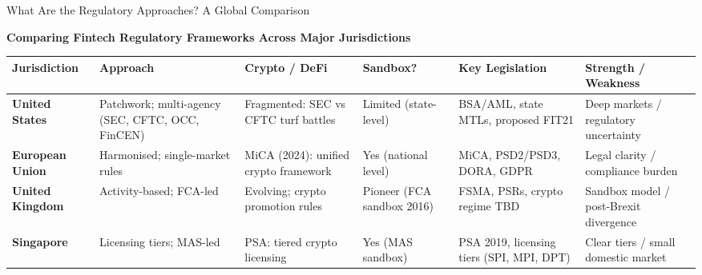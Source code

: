 \documentclass[aspectratio=169, 11pt]{beamer}
\begin{document}
\begin{frame}[shrink=5]{What Are the Regulatory Approaches? A Global Comparison}

\vspace{-0.1em}
\begin{center}
\textcolor{mlteal}{\textbf{\small Comparing Fintech Regulatory Frameworks Across Major Jurisdictions}}
\vspace{0.5em}

\scriptsize
\setlength{\tabcolsep}{4pt}
\renewcommand{\arraystretch}{1.30}
\begin{tabular}{@{}lp{2.4cm}p{2.2cm}p{2.2cm}p{2.2cm}p{2.2cm}@{}}
  \toprule
  \textbf{Jurisdiction} & \textbf{Approach} & \textbf{Crypto / DeFi} & \textbf{Sandbox?} & \textbf{Key Legislation} & \textbf{Strength / Weakness} \\
  \midrule
  \textbf{United States} &
    Patchwork; multi-agency (SEC, CFTC, OCC, FinCEN) &
    \textcolor{mlred}{Fragmented}: SEC vs CFTC turf battles &
    \textcolor{mlorange!80!black}{Limited} (state-level) &
    BSA/AML, state MTLs, proposed FIT21 &
    \textcolor{mlgreen!70!black}{Deep markets} / \textcolor{mlred}{regulatory uncertainty} \\[3pt]

  \textbf{European Union} &
    Harmonised; single-market rules &
    \textcolor{mlgreen!70!black}{MiCA} (2024): unified crypto framework &
    \textcolor{mlgreen!70!black}{Yes} (national level) &
    MiCA, PSD2/PSD3, DORA, GDPR &
    \textcolor{mlgreen!70!black}{Legal clarity} / \textcolor{mlred}{compliance burden} \\[3pt]

  \textbf{United Kingdom} &
    Activity-based; FCA-led &
    Evolving; crypto promotion rules &
    \textcolor{mlgreen!70!black}{Pioneer} (FCA sandbox 2016) &
    FSMA, PSRs, crypto regime TBD &
    \textcolor{mlgreen!70!black}{Sandbox model} / \textcolor{mlorange!80!black}{post-Brexit divergence} \\[3pt]

  \textbf{Singapore} &
    Licensing tiers; MAS-led &
    \textcolor{mlgreen!70!black}{PSA}: tiered crypto licensing &
    \textcolor{mlgreen!70!black}{Yes} (MAS sandbox) &
    PSA 2019, licensing tiers (SPI, MPI, DPT) &
    \textcolor{mlgreen!70!black}{Clear tiers} / \textcolor{mlorange!80!black}{small domestic market} \\
  \bottomrule
\end{tabular}
\end{center}


\end{frame}
\end{document}
